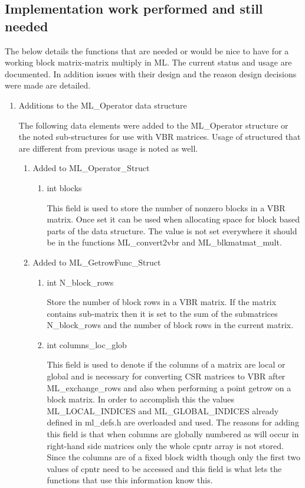 \documentclass[10pt,letter,relax]{SANDreport}
\begin{document}
\subsection{Implementation work performed and still needed}

The below details the functions that are needed or would be nice to have for a working block matrix-matrix multiply in ML.
The current status and usage are documented.
In addition issues with their design and the reason design decisions were made are detailed.

\begin{enumerate}
  \item  Additions to the ML\_Operator data structure

  The following data elements were added to the ML\_Operator structure or the noted sub-structures for use with VBR matrices.   Usage of structured that are different from previous usage is noted as well.

\begin{enumerate}

\item Added to ML\_Operator\_Struct

\begin{enumerate}

\item int blocks

 This field is used to store the number of nonzero blocks in a VBR matrix.  Once set it can be used when allocating space for block based parts of the data structure.  The value is not set everywhere it should be in the functions ML\_convert2vbr and ML\_blkmatmat\_mult.

\end{enumerate}

\item Added to ML\_GetrowFunc\_Struct

\begin{enumerate}

\item int N\_block\_rows

Store the number of block rows in a VBR matrix.  If the matrix contains sub-matrix then it is set to the sum of the submatrices N\_block\_rows and the number of block rows in the current matrix.

\item int columns\_loc\_glob

This field is used to denote if the columns of a matrix are local or global and is necessary for converting CSR matrices to VBR after ML\_exchange\_rows and also when performing a point getrow on a block matrix.
In order to accomplish this the values ML\_LOCAL\_INDICES and ML\_GLOBAL\_INDICES already defined in ml\_defs.h are overloaded and used.
The reasons for adding this field is that when columns are globally numbered as will occur in right-hand side matrices only the whole cpntr array is not stored.
Since the columns are of a fixed block width though only the first two values of cpntr need to be accessed and this field is what lets the functions that use this information know this.




\end{enumerate}
\end{enumerate}
\end{enumerate}
\end{document}

